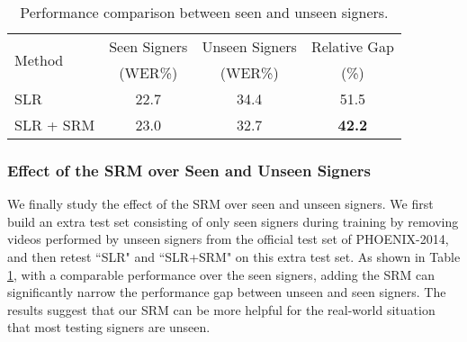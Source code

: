 \documentclass[acmsmall,screen]{acmart}
\begin{document}
\begin{table}[t]
\centering
\caption{Performance comparison between seen and unseen signers.}
\begin{tabular}{l|c|c|c}
\toprule
\multirow{2}{*}{Method} & Seen Signers & Unseen Signers & Relative Gap \\
& (WER\%) & (WER\%) & (\%) \\
\midrule
SLR & 22.7 & 34.4 & 51.5 \\
SLR + SRM & 23.0 & 32.7 & \textbf{42.2} \\
\bottomrule
\end{tabular}
\label{tab:srm_gap}
\end{table} \subsubsection{Effect of the SRM over Seen and Unseen Signers}
We finally study the effect of the SRM over seen and unseen signers. We first build an extra test set consisting of only seen signers during training by removing videos performed by unseen signers from the official test set of PHOENIX-2014, and then retest ``SLR" and ``SLR+SRM" on this extra test set. As shown in Table \ref{tab:srm_gap}, with a comparable performance over the seen signers, adding the SRM can significantly narrow the performance gap between unseen and seen signers. The results suggest that our SRM can be more helpful for the real-world situation that most testing signers are unseen.
\end{document}

